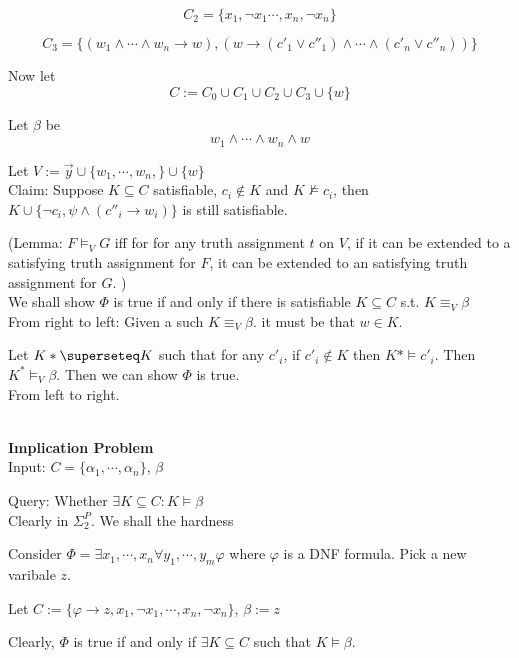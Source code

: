 \documentclass[12pt]{article}
\begin{document}
$$C_2=\{x_1,\neg x_1\cdots, x_n,\neg x_n\}$$

$$C_3=\{(w_1\wedge\cdots\wedge w_n\rightarrow w), (w\rightarrow (c'_1\vee c''_1)\wedge\cdots\wedge (c'_n\vee c''_n))\}$$

Now let $$C:=C_0\cup C_1\cup C_2\cup C_3\cup\{w\}$$

Let $\beta$ be $$ w_1\wedge\cdots\wedge w_n\wedge w$$

Let $V:=\vec{y}\cup\{w_1,\cdots,w_n,\}\cup\{w\}$\\


Claim: Suppose $K\subseteq C$ satisfiable, $c_i\not \in K$ and $K\not\models c_i$, then 
$K\cup\{\neg c_i, \psi\wedge (c''_i\rightarrow w_i)\}$ is still satisfiable.


(Lemma: $F\models_V G$ iff for for any truth assignment $t$ on $V$, if it can be extended to a satisfying truth assignment for $F$, it can be extended to an satisfying truth assignment for $G$. 
) \\

We shall show $\Phi$ is true if and only if there is satisfiable $K\subseteq C$ s.t. $K\equiv_V \beta$\\



From right to left:
Given a such $K\equiv_V \beta$. it must be that $w\in K$. 

Let $K*\superseteq K$ such that for any $c'_i$, if $c'_i\not\in K$ then $K*\models c'_i$. Then $K^*\models_V \beta$. Then we can show $\Phi$ is true.\\

From left to right.






\ \ \\

{\bf Implication Problem}\\

Input: $C=\{\alpha_1,\cdots,\alpha_n\}$, $\beta$

Query: Whether $\exists K\subseteq C: K\models \beta$\\ 

Clearly in $\Sigma_2^P$. We shall the hardness

Consider $\Phi=\exists x_1,\cdots, x_n\forall y_1,\cdots,y_m \varphi$ where $\varphi$ is a DNF formula. Pick a new varibale $z$.

Let $C:=\{\varphi\rightarrow z, x_1,\neg x_1,\cdots, x_n,\neg x_n\}$, $\beta:=z$

Clearly, $\Phi$ is true if and only if $\exists K\subseteq C$ such that $K\models \beta$.
\end{document}

